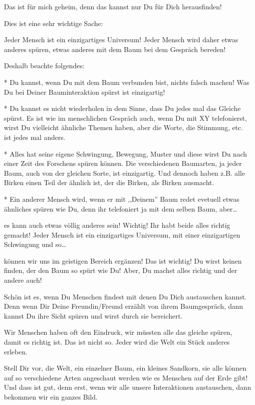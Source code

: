 \documentclass[11pt,titlepage,a5paper]{book}
\begin{document}
Das ist für mich geheim, denn das kannst nur Du für Dich herausfinden!

Dies ist eine sehr wichtige Sache:

Jeder Mensch ist ein einzigartiges Universum! Jeder Mensch wird daher etwas anderes spüren, etwas anderes mit dem Baum bei dem Gespräch bereden!

Deshalb beachte folgendes:

* Du kannst, wenn Du mit dem Baum verbunden bist, nichts falsch machen! Was Du bei Deiner Bauminteraktion spürst ist einzigartig!

* Du kannst es nicht wiederholen in dem Sinne, dass Du jedes mal das Gleiche spürst. Es ist wie im menschlichen Gespräch auch, wenn Du mit XY telefonierst, wirst Du vielleicht ähnliche Themen haben, aber die Worte, die Stimmung, etc. ist jedes mal anders.

* Alles hat seine eigene Schwingung, Bewegung, Muster und diese wirst Du nach einer Zeit des Forschens spüren können. Die verschiedenen Baumarten, ja jeder Baum, auch von der gleichen Sorte, ist einzigartig. Und dennoch haben z.B. alle Birken einen Teil der ähnlich ist, der die Birken, als Birken ausmacht.

* Ein anderer Mensch wird, wenn er mit ,,Deinem'' Baum redet evetuell etwas ähnliches spüren wie Du, denn ihr telefoniert ja mit dem selben Baum, aber\dots

es kann auch etwas völlig anderes sein! Wichtig! Ihr habt beide alles richtig gemacht! Jeder Mensch ist ein einzigartiges Universum, mit einer einzigartigen Schwingung und so\dots

können wir uns im geistigen Bereich ergänzen!
Das ist wichtig! Du wirst keinen finden, der den Baum so spürt wie Du! Aber, Du machst alles richtig und der andere auch!

Schön ist es, wenn Du Menschen findest mit denen Du Dich austauschen kannst. Denn wenn Dir Deine Freundin/Freund erzählt von ihrem Baumgespräch, dann kannst Du ihre Sicht spüren und wirst durch sie bereichert.

Wir Menschen haben oft den Eindruck, wir müssten alle das gleiche spüren, damit es richtig ist. Das ist nicht so. Jeder wird die Welt ein Stück anderes erleben.

Stell Dir vor, die Welt, ein einzelner Baum, ein kleines Sandkorn, sie alle können auf so verschiedene Arten angeschaut werden wie es Menschen auf der Erde gibt! Und dass ist gut, denn erst, wenn wir alle unsere Interaktionen austauschen, dann bekommen wir ein ganzes Bild. 
\end{document}
